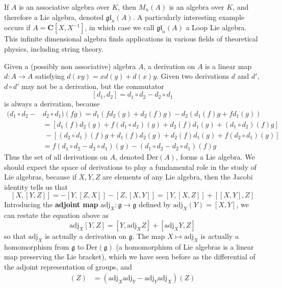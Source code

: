\begin{example}
    If $A$ is an associative algebra over $K$, then $M_n(A)$ is an algebra over $K$, and therefore a Lie algebra, denoted $\mathfrak{gl}_n(A)$. A particularly interesting example occurs if $A = \mathbf{C}[X,X^{-1}]$, in which case we call $\mathfrak{gl}_n(A)$ a Loop Lie algebra. This infinite dimensional algebra finds applications in various fields of theoretical physics, including string theory.
\end{example}

\begin{example}
    Given a (possibly non associative) algebra $A$, a derivation on $A$ is a linear map $d: A \to A$ satisfying $d(xy) = xd(y) + d(x)y$. Given two derivations $d$ and $d'$, $d \circ d'$ may not be a derivation, but the commutator
    \[ [d_1, d_2] = d_1 \circ d_2 - d_2 \circ d_1 \]
    is always a derivation, because
    \begin{align*}
        (d_1 \circ d_2 - &d_2 \circ d_1)(fg) = d_1(f d_2(g) + d_2(f) g) - d_2(d_1(f) g + f d_1(g))\\
        &= [d_1(f) d_2(g) + f (d_1 \circ d_2)(g) + d_2(f) d_1(g) + (d_1 \circ d_2)(f) g]\\
        &\ - [(d_2 \circ d_1)(f) g + d_1(f) d_2(g) + d_2(f) d_1(g) + f (d_2 \circ d_1)(g)]\\
        &= f(d_1 \circ d_2 - d_2 \circ d_1)(g) - (d_1 \circ d_2 - d_2 \circ d_1)(f) g
    \end{align*}
    Thus the set of all derivations on $A$, denoted $\text{Der}(A)$, forms a Lie algebra. We should expect the space of derivations to play a fundamental role in the study of Lie algebras, because if $X,Y,Z$ are elements of any Lie algebra, then the Jacobi identity tells us that
    \[ [X,[Y,Z]] = - [Y,[Z,X]] - [Z,[X,Y]] = [Y,[X,Z]] + [[X,Y],Z] \]
    Introducing the {\bf adjoint map} $\text{adj}_X: \mathfrak{g} \to \mathfrak{g}$ defined by $\text{adj}_X(Y) = [X,Y]$, we can restate the equation above as
    \[ \text{adj}_X[Y,Z] = [Y, \text{adj}_X Z] + [\text{adj}_XY, Z] \]
    so that $\text{adj}_X$ is actually a derivation on $\mathfrak{g}$. The map $X \mapsto \text{adj}_X$ is actually a homomorphism from $\mathfrak{g}$ to $\text{Der}(\mathfrak{g})$ (a homomorphism of Lie algebras is a linear map preserving the Lie bracket), which we have seen before as the differential of the adjoint representation of groups, and
    \begin{align*}
        [\text{adj}_X, \text{adj}_Y](Z) &= (\text{adj}_X \text{adj}_Y - \text{adj}_Y \text{adj}_X)(Z)\\

\end{align*}
\end{example}
